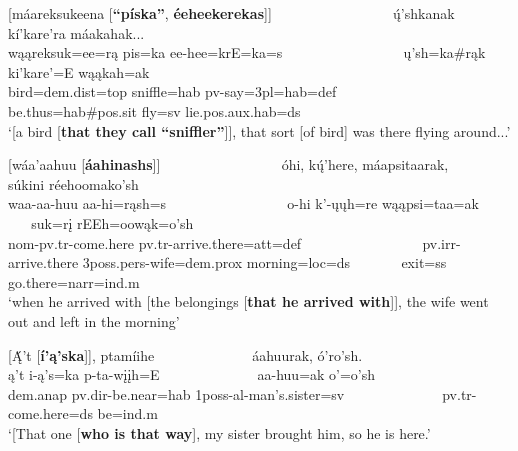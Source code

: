 \begin{exe}
\begin{xlist}
        \item\label{Ch5RCExamplesD} \glll \textnormal{[}máareksukeena \textnormal{[}\textbf{``píska''}, \textbf{éeheekerekas}\textnormal{]]} ~ ~ ~ ~ ~ ~ ~ ~ ~ ~ ų́'shkanak kí'kare'ra máakahak...\\
        wąąreksuk=ee=rą pis=ka ee-hee=krE=ka=s ~ ~ ~ ~ ~ ~ ~ ~ ~ ~ ų'sh=ka\#rąk ki'kare'=E wąąkah=ak\\
        \textnormal{bird}=dem.dist=top \textnormal{sniffle}=hab pv-\textnormal{say}=3pl=hab=def ~ ~ ~ ~ ~ ~ ~ ~ ~ ~ \textnormal{be.thus}=hab\#pos.sit \textnormal{fly}=sv \textnormal{lie}.pos.aux.hab=ds\\
        \glt `[a bird [\textbf{that they call ``sniffler{''}}]], that sort [of bird] was there flying around...' \citep[18]{hollow1973a}

        \item\label{Ch5RCExamplesE} \glll \textnormal{[}wáa'aahuu \textnormal{[}\textbf{áahinashs}\textnormal{]]} ~ ~ ~ ~ ~ ~ ~ ~ ~ ~ óhi, kų́'here, máapsitaarak, ~ ~ ~ ~ súkini réehoomako'sh\\
        waa-aa-huu aa-hi=rąsh=s ~ ~ ~ ~ ~ ~ ~ ~ ~ ~ o-hi k'-ųųh=re wąąpsi=taa=ak ~ ~ ~ ~ suk=rį  rEEh=oowąk=o'sh\\
        nom-pv.tr-\textnormal{come.here} pv.tr-\textnormal{arrive.there}=att=def ~ ~ ~ ~ ~ ~ ~ ~ ~ ~ pv.irr-\textnormal{arrive.there} 3poss.pers-\textnormal{wife}=dem.prox \textnormal{morning}=loc=ds ~ ~ ~ ~ \textnormal{exit}=ss \textnormal{go.there}=narr=ind.m\\
        \glt `when he arrived with [the belongings [\textbf{that he arrived with}]], the wife went out and left in the morning' \citep[67]{trechter2012b}

        \item\label{Ch5RCExamplesF} \glll \textnormal{[}Ą́'t \textnormal{[}\textbf{í'ą'ska}\textnormal{]]}, ptamíihe ~ ~ ~ ~ ~ ~ ~ ~ áahuurak, ó'ro'sh.\\
        ą't i-ą's=ka p-ta-wįįh=E ~ ~ ~ ~ ~ ~ ~ ~ aa-huu=ak o'=o'sh\\
        dem.anap pv.dir-\textnormal{be.near}=hab 1poss-al-\textnormal{man's.sister}=sv ~ ~ ~ ~ ~ ~ ~ ~ pv.tr-\textnormal{come.here}=ds \textnormal{be}=ind.m\\
        \glt `\textnormal{[}That one [\textbf{who is that way}], my sister brought him, so he is here.' \citep[129]{hollow1973a}
        
    \end{xlist}
\end{exe}

